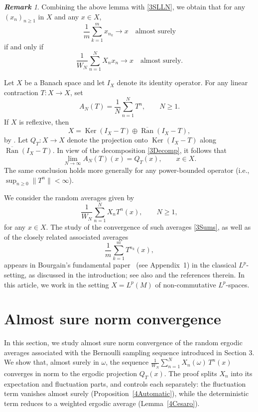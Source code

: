 \documentclass[12pt]{amsart}
\theoremstyle{remark}
\newtheorem{remark}[theorem]{\bf Remark}
\theoremstyle{definition}
\numberwithin{equation}{section}
\begin{document}
\begin{remark}
Combining the above lemma with \eqref{3SLLN}, we obtain that for any $(x_n)_{n \ge 1}$ in $X$ and any $x \in X$,
$$
\frac{1}{m} \sum_{k=1}^m x_{n_k} \longrightarrow x \quad \text{almost surely}
$$
if and only if
$$
\frac{1}{W_N} \sum_{n=1}^N X_n x_n \longrightarrow x \quad \text{almost surely}.
$$
\end{remark}

Let $X$ be a Banach space and let $I_X$ denote its identity operator.  
For any linear contraction $T \colon X \to X$, set
$$
A_N(T) = \frac{1}{N} \sum_{n=1}^N T^n, \qquad N \ge 1.
$$
If \(X\) is reflexive, then
\begin{equation}\label{3Decomp}
X = \operatorname{Ker}(I_X - T) \oplus \overline{\operatorname{Ran}}(I_X - T),
\end{equation}
by \cite[Theorem 8.22]{EFHN}.
Let \(Q_T \colon X \to X\) denote the projection onto \(\operatorname{Ker}(I_X - T)\) along \(\overline{\operatorname{Ran}}(I_X - T)\). In view of the decomposition \eqref{3Decomp}, it follows that
\begin{equation}\label{3MET}
\lim_{N \to \infty} A_N(T)(x) = Q_T(x), \qquad x \in X.
\end{equation}
The same conclusion holds more generally for any power-bounded operator (i.e., \(\displaystyle{\sup_{n \ge 0} \|T^n\| < \infty}\)).

We consider the random averages given by
\begin{equation}\label{3Sums}
\frac{1}{W_N} \sum_{n=1}^N X_n T^n(x), \qquad N \ge 1,
\end{equation}
for any \(x \in X\). The study of the convergence of such averages \eqref{3Sums}, as well as of the closely related associated averages
\[
\frac{1}{m} \sum_{k=1}^m T^{n_k}(x),
\]
appears in Bourgain's fundamental paper~\cite{B} (see Appendix~1) in the classical $L^p$-setting, as discussed in the introduction; see also \cite[Chapter~5]{K} and the references therein. In this article, we work in the setting $X=L^p(M)$ of non-commutative $L^p$-spaces.

\section{Almost sure norm convergence}\label{4}

In this section, we study almost sure norm convergence of the random ergodic averages associated with the Bernoulli sampling sequence introduced in Section 3. We show that, almost surely in $\omega$, the sequence
\(\frac{1}{W_N}\sum_{n=1}^N X_n(\omega)\, T^n(x)\)
converges in norm to the ergodic projection $Q_T(x)$. The proof splits $X_n$ into its expectation and fluctuation parts, and controls each separately: the fluctuation term vanishes almost surely (Proposition~\ref{4Automatic}), while the deterministic term reduces to a weighted ergodic average (Lemma~\ref{4Cesaro}).
\medskip
\end{document}
